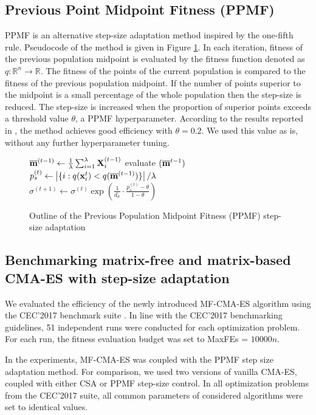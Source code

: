 \documentclass[dvipsnames,format=sigconf,anonymous=false,review=false]{acmart}
\begin{document}
\subsection{Previous Point Midpoint Fitness (PPMF)}

PPMF is an alternative step-size adaptation method inspired by the one-fifth rule. Pseudocode of the method is given in Figure \ref{alg:PPMF}. In each iteration, fitness of the previous population midpoint is evaluated by the fitness function denoted as $q\colon \mathbb{R}^{n} \rightarrow \mathbb{R}$. The fitness of the points of the current population is compared to the fitness of the previous population midpoint. If the number of points superior to the midpoint is a small percentage of the whole population then the step-size is reduced. The step-size is increased when the proportion of superior points exceeds a threshold value $\theta$, a PPMF hyperparameter. According to the results reported in \cite{Warchulski2021}, the method achieves good efficiency with $\theta=0.2$. We used this value as is, without any further hyperparameter tuning.

\begin{figure}[h]
\begin{algorithmic}[1]
    \STATE $\overline{{\bf m}}^{(t-1)} \gets \frac{1}{\lambda}\sum_{i=1}^\lambda {\bf X}_i^{(t-1)}$
   \STATE evaluate $(\overline{{\bf m}}^{t-1})$
   \STATE $p^{(t)}_{s} \gets \left|\{i: q({\bf x}_{i}^{t}) < q(\overline{{\bf m}}^{(t-1)})\}\right|/\lambda$
   \STATE $\sigma^{(t+1)} \gets \sigma^{(t)} \exp\left(\frac{1}{d_\sigma} \cdot \frac{p^{(t)}_s-\theta}{1-\theta}\right) $
\end{algorithmic}
\caption{Outline of the Previous Population Midpoint Fitness (PPMF) step-size adaptation}
\label{alg:PPMF}
\end{figure}

\subsection{Benchmarking matrix-free and matrix-based CMA-ES with step-size adaptation}

We evaluated the efficiency of the newly introduced MF-CMA-ES algorithm using the CEC'2017 benchmark suite \cite{suganthan2017problem}. In line with the CEC'2017 benchmarking guidelines, 51 independent runs were conducted for each optimization problem. For each run, the fitness evaluation budget was set to MaxFEs = $10000n$.

In the experiments, MF-CMA-ES was coupled with the PPMF step size adaptation method. For comparison, we used two versions of vanilla CMA-ES, coupled with either CSA or PPMF step-size control. In all optimization problems from the CEC'2017 suite, all common parameters of considered algorithms were set to identical values.
\end{document}
